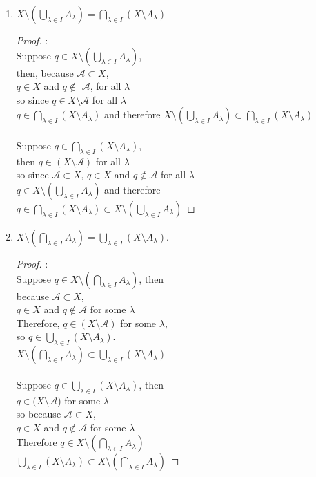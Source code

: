 \documentclass[openany, amssymb, psamsfonts]{amsart}
\theoremstyle{definition}
\numberwithin{equation}{section}
\begin{document}
\begin{enumerate} [1]

\item$X\setminus \left( \bigcup_{\lambda\in I}A_\lambda\right) =\bigcap_{\lambda\in I} (X\setminus A_\lambda)$
\begin{proof}:\\
Suppose $q\in X\setminus \left( \bigcup_{\lambda\in I}A_\lambda\right)$, \\
then, because $\mathcal{A} \subset X$, \\
$q\in X$ and $q\notin$ $\mathcal{A}$, for all $\lambda$\\
so since $q\in X \setminus \mathcal{A}$ for all $\lambda$ \\
$q\in \bigcap_{\lambda\in I} (X\setminus A_\lambda)$ and therefore $X\setminus \left( \bigcup_{\lambda\in I}A_\lambda\right) \subset \bigcap_{\lambda\in I} (X\setminus A_\lambda)$\\\\
Suppose $q\in \bigcap_{\lambda\in I} (X\setminus A_\lambda)$,\\
then $q\in (X\setminus \mathcal{A})$ for all $\lambda$\\
so since $\mathcal{A} \subset X$, $q\in X$ and $q\notin \mathcal{A}$ for all $\lambda$\\
$q\in X\setminus \left( \bigcup_{\lambda\in I}A_\lambda\right)$ and therefore\\
$q\in \bigcap_{\lambda\in I} (X\setminus A_\lambda) \subset X\setminus \left( \bigcup_{\lambda\in I}A_\lambda\right)$
\end{proof}


\item$X\setminus \left( \bigcap_{\lambda\in I}A_\lambda\right)  =\bigcup_{\lambda\in I} (X\setminus A_\lambda).$

\begin{proof}:\\
Suppose $q\in X\setminus \left( \bigcap_{\lambda\in I}A_\lambda\right)$, then \\
because $\mathcal{A} \subset X$, \\
$q\in X$ and $q\notin \mathcal{A}$ for some $\lambda$\\
Therefore, $q\in (X\setminus \mathcal{A})$ for some $\lambda$,\\
so $q\in \bigcup_{\lambda\in I} (X\setminus A_\lambda).$\\
$ X\setminus \left( \bigcap_{\lambda\in I}A_\lambda\right) \subset \bigcup_{\lambda\in I} (X\setminus A_\lambda)$\\\\
Suppose $q\in \bigcup_{\lambda\in I} (X\setminus A_\lambda)$, then\\
$q\in (X\setminus \mathcal{A}$) for some $\lambda$\\
so because $\mathcal{A} \subset X$, \\
$q\in X$ and $q\notin \mathcal{A}$ for some $\lambda$\\
Therefore $q\in X\setminus \left( \bigcap_{\lambda\in I}A_\lambda\right)$\\
$\bigcup_{\lambda\in I} (X\setminus A_\lambda)\subset X\setminus \left( \bigcap_{\lambda\in I}A_\lambda\right)$
\end{proof}
\end{enumerate}
\end{document}
